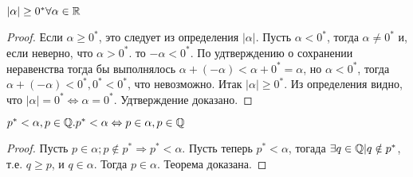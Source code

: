 \documentclass[main]{subfiles}
\begin{document}
\begin{assertion}
    $|\alpha| \geq 0^* \forall \alpha \in \mathbb{R}$
\end{assertion}
\begin{proof}
    Если $\alpha \geq 0^*$, это следует из определения $|\alpha|$. Пусть
    $\alpha < 0^*$, тогда $\alpha \neq 0^*$ и, если неверно, что $\alpha > 0^*$.
    то $-\alpha < 0^*$. По удтверждению о сохранении неравенства тогда бы
    выполнялось $\alpha + (-\alpha) < \alpha + 0^* = \alpha$, но $\alpha < 0^*$,
    тогда $\alpha + (-\alpha) < 0^*, 0^* < 0^*$, что невозможно. Итак
    $|\alpha| \geq 0^*$. Из определения видно, что $|\alpha| = 0^* \Leftrightarrow
        \alpha = 0^*$. Удтверждение доказано.
\end{proof}

\begin{theorem}
    $p^* < \alpha, p \in \mathbb{Q}. p^* < \alpha \Leftrightarrow p \in \alpha, p \in \mathbb{Q}$
\end{theorem}
\begin{proof}
    Пусть $p \in \alpha; p \notin p^* \Rightarrow p^* < \alpha$. Пусть теперь
    $p^* < \alpha$, тогада $\exists q \in \mathbb{Q} | q \notin p^*$, т.е. $q \geq p$,
    и $q \in \alpha$. Тогда $p \in \alpha$. Теорема доказана.
\end{proof}
\end{document}
